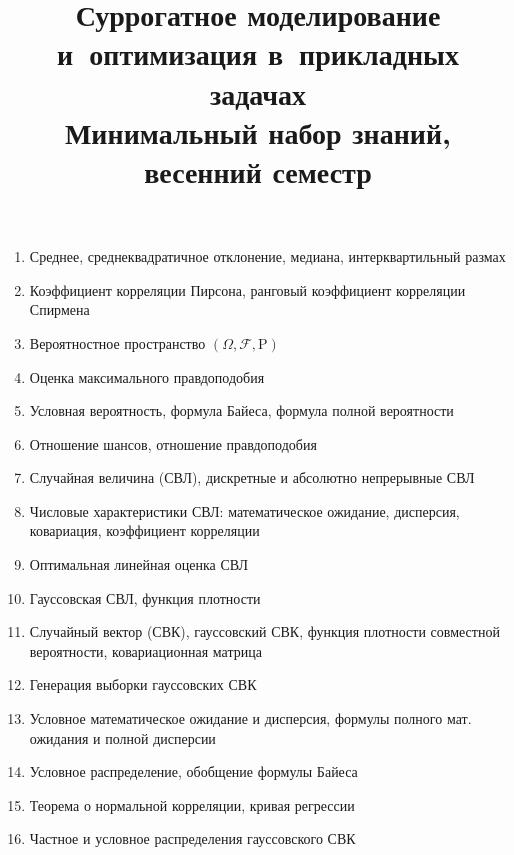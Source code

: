 \documentclass[12pt,oneside,openany]{article}
\begin{document}
\title{
  \large
  \textbf{Суррогатное моделирование и~оптимизация в~прикладных задачах} \\
  Минимальный набор знаний, весенний семестр
}

\author{}
\date{}

\maketitle
\thispagestyle{empty}

\vspace{-10ex}


\begin{enumerate}
  
    \item Среднее, среднеквадратичное отклонение, медиана, интерквартильный размах
    \item Коэффициент корреляции Пирсона, ранговый коэффициент корреляции Спирмена

    \item Вероятностное пространство $\left( \Omega, \mathcal{F}, \mathrm{P} \right)$
    \item Оценка максимального правдоподобия
    \item Условная вероятность, формула Байеса, формула полной вероятности
    \item Отношение шансов, отношение правдоподобия
    

    \item Случайная величина (СВЛ), дискретные и абсолютно непрерывные СВЛ
    \item Числовые характеристики СВЛ: математическое ожидание, дисперсия, ковариация, коэффициент корреляции
    \item Оптимальная линейная оценка СВЛ

    \item Гауссовская СВЛ, функция плотности
    \item Случайный вектор (СВК), гауссовский СВК, функция плотности совместной вероятности, ковариационная матрица
    \item Генерация выборки гауссовских СВК

    \item Условное математическое ожидание и дисперсия, формулы полного мат. ожидания и полной дисперсии
    \item Условное распределение, обобщение формулы Байеса
    \item Теорема о нормальной корреляции, кривая регрессии
    \item Частное и условное распределения гауссовского СВК


\end{enumerate}
\end{document}
